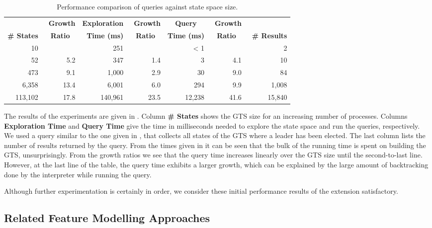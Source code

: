 \begin{table}
\centering
\caption{Performance comparison of \Prolog queries against state space size.}
\begin{tabular}{rr|rr|rr|r}
\hline
 & \ \bf Growth & \bf Exploration & \ \bf Growth & \multicolumn{1}{c}{\bf Query}
& \ \bf Growth & \\
\bf \# States & \multicolumn{1}{c|}{\bf Ratio} & \bf Time (ms) &
\multicolumn{1}{c|}{\bf Ratio} & \bf Time (ms) & \multicolumn{1}{c|}{\bf Ratio}
& \ \bf \# Results\\
\hline
10      &      &     251 &      &    < 1 &      & 2 \\
52      &  5.2 &     347 &  1.4 &      3 &  4.1 & 10 \\
473     &  9.1 &   1,000 &  2.9 &     30 &  9.0 & 84 \\
6,358   & 13.4 &   6,001 &  6.0 &    294 &  9.9 & 1,008 \\
113,102 & 17.8 & 140,961 & 23.5 & 12,238 & 41.6 & 15,840 \\
\hline
\end{tabular}
\end{table}

The results of the experiments are given in . Column {\bf \# States}
shows the GTS size for an increasing number of processes. Columns {\bf
Exploration Time} and {\bf Query Time} give the time in milliseconds needed to
explore the state space and run the \Prolog queries, respectively. We used a
query similar to the one given in , that collects all states of the
GTS where a leader has been elected. The last column lists the number of results
returned by the query. From the times given in  it can be seen that
the bulk of the running time is spent on building the GTS, unsurprisingly.
From the growth ratios we see that the query time increases linearly over the
GTS size until the second-to-last line. However, at the last line of the table,
the query time exhibits a larger growth, which can be explained by the large
amount of backtracking done by the \Prolog interpreter while running the query.

Although further experimentation is certainly in order, we consider these
initial performance results of the \Prolog extension satisfactory.

\subsection{Related Feature Modelling Approaches}

